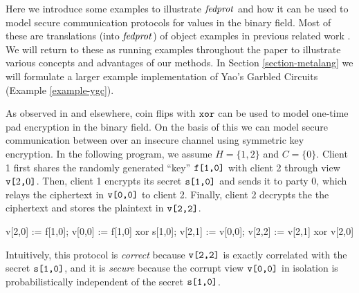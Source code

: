Here we introduce some examples to illustrate $\mathit{fedprot}$ and how it
can be used to model secure communication protocols for values in the
binary field. Most of these are translations (into $\mathit{fedprot}$) of
object examples in previous related work \cite{XXX}. We will return to
these as running examples throughout the paper to illustrate various
concepts and advantages of our methods. In Section \ref{section-metalang}
we will formulate a larger example implementation of Yao's
Garbled Circuits (Example \ref{example-ygc}). 
\begin{example}
  \label{example-otp}
As observed in \cite{XXX} and elsewhere, coin flips with $\texttt{xor}$ can
be used to model one-time pad encryption in the binary field. On the
basis of this we can model secure communication between over an
insecure channel using symmetric key encryption. In the following
program, we assume $H = \{ 1,2 \}$ and $C = \{ 0 \}$. Client 1 first
shares the randomly generated ``key'' $\texttt{f[1,0]}$ with client 2
through view $\texttt{v[}2\texttt{,}0\texttt{]}$. Then, client 1 encrypts its secret
$\texttt{s[1,0]}$ and sends it to party 0, which relays the ciphertext in
$\texttt{v[0,0]}$ to client 2. Finally, client 2 decrypts the the ciphertext
and stores the plaintext in $\texttt{v[2,2]}$.
\begin{verbatimtab}
v[2,0] := f[1,0];
v[0,0] := f[1,0] xor s[1,0];
v[2,1] := v[0,0];
v[2,2] := v[2,1] xor v[2,0]
\end{verbatimtab}
Intuitively, this protocol is \emph{correct} because $\texttt{v[2,2]}$ is
exactly correlated with the secret $\texttt{s[1,0]}$, and it is
\emph{secure} because the corrupt view $\texttt{v[0,0]}$ in isolation is
probabilistically independent of the secret $\texttt{s[1,0]}$.
\end{example}

